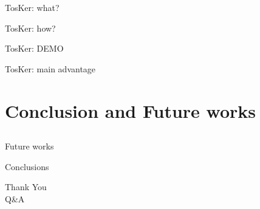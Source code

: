 \documentclass{beamer}
\begin{document}
  \begin{frame}{TosKer: what?}

  \end{frame}

  \begin{frame}{TosKer: how?}

  \end{frame}

  \begin{frame}{TosKer: DEMO}

  \end{frame}

  \begin{frame}{TosKer: main advantage}

  \end{frame}

\section{Conclusion and Future works}\subsection*{}

  \begin{frame}{Future works}

  \end{frame}

  \begin{frame}{Conclusions}

  \end{frame}

  \begin{frame}
    \centering
    \Huge Thank You \\
    \bigskip
    \LARGE Q\&A
  \end{frame}
\end{document}
